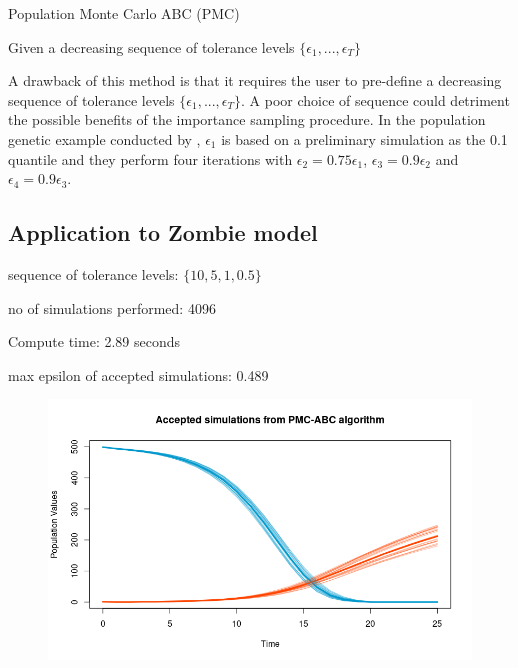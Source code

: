\documentclass[]{article}
\begin{document}
	
	\begin{algorithm}[H]
		\label{PMC ABC}
		\caption{Population Monte Carlo ABC (PMC)}
		Given a decreasing sequence of tolerance levels $\{\epsilon_1, ..., \epsilon_T\}$\;
	\end{algorithm}	
	
	A drawback of this method is that it requires the user to pre-define a decreasing sequence of tolerance levels $\{\epsilon_1, ..., \epsilon_T\}$. A poor choice of sequence could detriment the possible benefits of the importance sampling procedure. In the population genetic example conducted by \cite{RN21}, $\epsilon_1$ is based on a preliminary simulation as the 0.1 quantile and they perform four iterations with $\epsilon_2 = 0.75\epsilon_1$, $\epsilon_3 = 0.9\epsilon_2$ and $\epsilon_4 = 0.9\epsilon_3$.
	
	\subsection{Application to Zombie model}
	
	sequence of tolerance levels: $\{ 10, 5, 1, 0.5\}$
	
	no of simulations performed: 4096
	
	Compute time: 2.89 seconds
	
	max epsilon of accepted simulations: 0.489
	
	\begin{figure}[H]
		\centering
		\includegraphics[width=0.8\linewidth]{../Figures/PMC-ABC_simulations}
	\end{figure}
	
\end{document}
